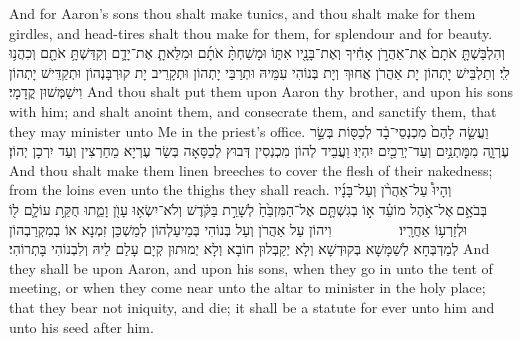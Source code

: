 {And for Aaron’s sons thou shalt make tunics, and thou shalt make for them girdles, and head-tires shalt thou make for them, for splendour and for beauty.}{}
{וְהִלְבַּשְׁתָּ֤ אֹתָם֙ אֶת־אַהֲרֹ֣ן אָחִ֔יךָ וְאֶת־בָּנָ֖יו אִתּ֑וֹ וּמָשַׁחְתָּ֨ אֹתָ֜ם וּמִלֵּאתָ֧ אֶת־יָדָ֛ם וְקִדַּשְׁתָּ֥ אֹתָ֖ם וְכִהֲנ֥וּ לִֽי׃
}
{וְתַלְבֵּישׁ יָתְהוֹן יָת אַהֲרֹן אֲחוּךְ וְיָת בְּנוֹהִי עִמֵּיהּ וּתְרַבֵּי יָתְהוֹן וּתְקָרֵיב יָת קוּרְבָּנְהוֹן וּתְקַדֵּישׁ יָתְהוֹן וִישַׁמְּשׁוּן קֳדָמָי׃}
{And thou shalt put them upon Aaron thy brother, and upon his sons with him; and shalt anoint them, and consecrate them, and sanctify them, that they may minister unto Me in the priest’s office.}{}
{וַעֲשֵׂ֤ה לָהֶם֙ מִכְנְסֵי־בָ֔ד לְכַסּ֖וֹת בְּשַׂ֣ר עֶרְוָ֑ה מִמׇּתְנַ֥יִם וְעַד־יְרֵכַ֖יִם יִהְיֽוּ׃
}
{וַעֲבֵיד לְהוֹן מִכְנְסִין דְּבוּץ לְכַסָּאָה בְּשַׂר עֶרְיָא מֵחַרְצִין וְעַד יִרְכָן יְהוֹן׃}
{And thou shalt make them linen breeches to cover the flesh of their nakedness; from the loins even unto the thighs they shall reach.}{}
{וְהָיוּ֩ עַל־אַהֲרֹ֨ן וְעַל־בָּנָ֜יו בְּבֹאָ֣ם \legarmeh  אֶל־אֹ֣הֶל מוֹעֵ֗ד א֣וֹ בְגִשְׁתָּ֤ם אֶל־הַמִּזְבֵּ֙חַ֙ לְשָׁרֵ֣ת בַּקֹּ֔דֶשׁ וְלֹא־יִשְׂא֥וּ עָוֺ֖ן וָמֵ֑תוּ חֻקַּ֥ת עוֹלָ֛ם ל֖וֹ וּלְזַרְע֥וֹ אַחֲרָֽיו׃ \setuma         
}
{וִיהוֹן עַל אַהֲרֹן וְעַל בְּנוֹהִי בְּמֵיעַלְהוֹן לְמַשְׁכַּן זִמְנָא אוֹ בְמִקְרַבְהוֹן לְמַדְבְּחָא לְשַׁמָּשָׁא בְּקוּדְשָׁא וְלָא יְקַבְּלוּן חוֹבָא וְלָא יְמוּתוּן קְיָם עָלַם לֵיהּ וְלִבְנוֹהִי בָּתְרוֹהִי׃}
{And they shall be upon Aaron, and upon his sons, when they go in unto the tent of meeting, or when they come near unto the altar to minister in the holy place; that they bear not iniquity, and die; it shall be a statute for ever unto him and unto his seed after him.}{}
